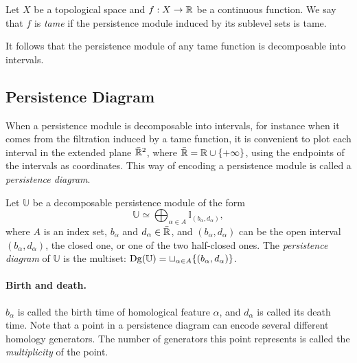 \begin{defin}
Let $X$ be a topological space and $f:X\rightarrow\mathbb{R}$ be a continuous function. We say that $f$ is 
{\em tame} if the persistence module induced by its sublevel sets is tame. %
\end{defin}

 It follows that the persistence module of any tame function is decomposable into intervals.






\subsection{Persistence Diagram}\label{sec:defPD}

When a persistence module is decomposable into intervals, for instance when it comes from
the filtration induced by a tame function, it is convenient to plot each interval
in the extended plane $\bar{\mathbb{R}}^2$, where $\bar{\mathbb{R}}=\mathbb{R}\cup\{+\infty\}$, using the endpoints of the intervals as coordinates.
This way of encoding a persistence module is called a {\em persistence diagram}.

\begin{defin} 
Let $\mathbb{U}$ be a decomposable persistence module of the 
form $$\mathbb{U}\simeq\bigoplus_{\alpha\in A}\mathbb{I}_{(b_\alpha,d_\alpha)},$$ 
where $A$ is an index set,
$b_\alpha$ and $d_\alpha\in\bar{\mathbb{R}}$, and 
$(b_\alpha,d_\alpha)$ can be the open interval $(b_\alpha,d_\alpha)$, the closed one, or one of the 
two half-closed ones. The {\em persistence diagram} of $\mathbb{U}$ is the multiset: 
$\mathrm{Dg}(\mathbb{U})=\sqcup_{\alpha\in A} \{(b_\alpha,d_\alpha)\}$. %
\end{defin}

\paragraph*{Birth and death.}
$b_\alpha$ is called the birth time of homological feature $\alpha$, 
and $d_\alpha$ is called its death time. Note that a point in a persistence diagram can 
encode several different homology generators. The number of generators this point represents 
is called the \textit{multiplicity} of the point. 

